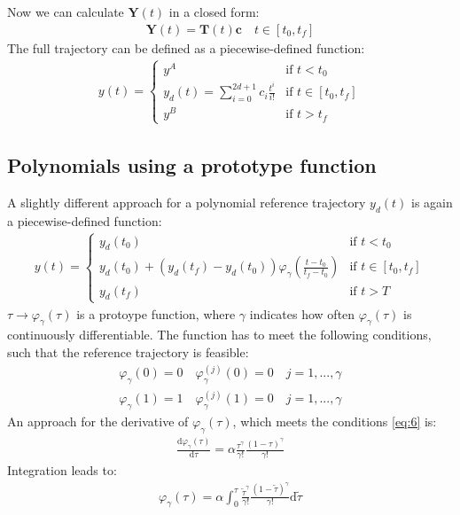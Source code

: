\documentclass[a4paper,11pt,headings=standardclasses,parskip=half]{scrartcl}
\renewcommand{\d}{\mathrm{d}} %
\newcommand{\y}{\mathbf{y}}
\begin{document}
Now we can calculate $\mathbf{Y}(t)$ in a closed form:
\begin{align}
\label{eq:3}
\mathbf{Y}(t)=\mathbf{T}(t)\mathbf{c} \quad t \in [t_0,t_f] 
\end{align}
The full trajectory can be defined as a piecewise-defined function:
\begin{align}
y(t)=\begin{cases}y^A & \textrm{if } t<t_0 \\ y_d(t) =\sum_{i=0}^{2d+1}c_i\frac{t^i}{i!} & \textrm{if } t\in [t_0,t_f] \\y^B & \textrm{if } t>t_f\end{cases}
\end{align}
\subsection{Polynomials using a prototype function}
A slightly different approach for a polynomial reference trajectory $y_d(t)$ is again a piecewise-defined function:
\begin{align}
\label{eq:5}
y(t) = \begin{cases} y_d(t_0) &\textrm{if } t<t_0 \\ y_d(t_0) + (y_d(t_f)-y_d(t_0))\varphi_\gamma\left(\frac{t-t_0}{t_f-t_0}\right) &\textrm{if } t \in [t_0, t_f] \\ y_d(t_f) &\textrm{if } t>T\end{cases}
\end{align}
$\tau \rightarrow \varphi_\gamma(\tau)$ is a protoype function, where $\gamma$ indicates how often $\varphi_\gamma(\tau)$ is continuously differentiable. The function has to meet the following conditions, such that the reference trajectory is feasible:
\begin{subequations}
\label{eq:6}
\begin{align}
\varphi_\gamma(0)=0 \quad \varphi^{(j)}_\gamma(0)=0 \quad j = 1,...,\gamma \\
\varphi_\gamma(1)=1 \quad \varphi^{(j)}_\gamma(1)=0 \quad j = 1,...,\gamma 
\end{align}
\end{subequations}
An approach for the derivative of $\varphi_\gamma(\tau)$, which meets the conditions \eqref{eq:6} is:
\begin{align}
\frac{\d \varphi_\gamma(\tau)}{\d \tau} = \alpha \frac{\tau^{\gamma}}{\gamma!}\frac{(1-\tau)^{\gamma}}{\gamma!}
\end{align}
Integration leads to:
\begin{align}
\varphi_\gamma(\tau) = \alpha \int_0^\tau\frac{\tilde{\tau}^{\gamma}}{\gamma!}\frac{(1-\tilde{\tau})^{\gamma}}{\gamma!} \d \tilde{\tau}
\end{align}
\end{document}
